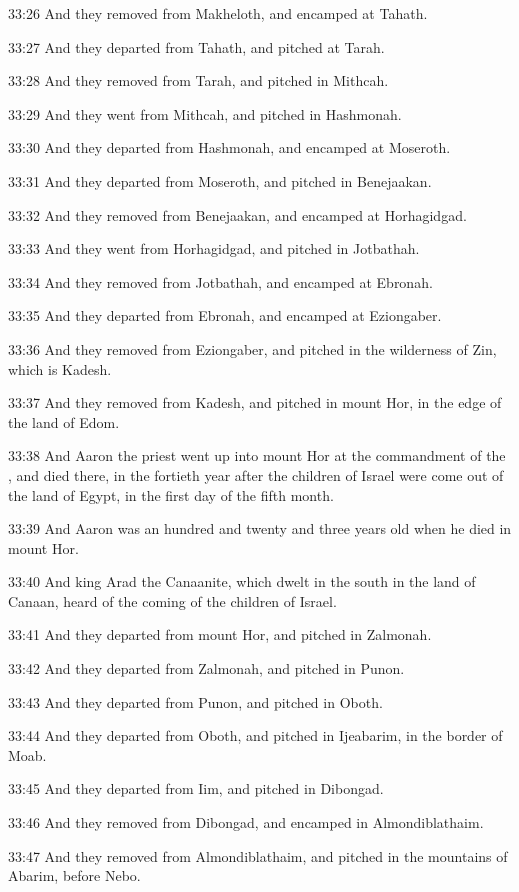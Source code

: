 33:26 And they removed from Makheloth, and encamped at Tahath.

33:27 And they departed from Tahath, and pitched at Tarah.

33:28 And they removed from Tarah, and pitched in Mithcah.

33:29 And they went from Mithcah, and pitched in Hashmonah.

33:30 And they departed from Hashmonah, and encamped at Moseroth.

33:31 And they departed from Moseroth, and pitched in Benejaakan.

33:32 And they removed from Benejaakan, and encamped at Horhagidgad.

33:33 And they went from Horhagidgad, and pitched in Jotbathah.

33:34 And they removed from Jotbathah, and encamped at Ebronah.

33:35 And they departed from Ebronah, and encamped at Eziongaber.

33:36 And they removed from Eziongaber, and pitched in the wilderness
of Zin, which is Kadesh.

33:37 And they removed from Kadesh, and pitched in mount Hor, in the
edge of the land of Edom.

33:38 And Aaron the priest went up into mount Hor at the commandment
of the \LORD, and died there, in the fortieth year after the children
of Israel were come out of the land of Egypt, in the first day of the
fifth month.

33:39 And Aaron was an hundred and twenty and three years old when he
died in mount Hor.

33:40 And king Arad the Canaanite, which dwelt in the south in the
land of Canaan, heard of the coming of the children of Israel.

33:41 And they departed from mount Hor, and pitched in Zalmonah.

33:42 And they departed from Zalmonah, and pitched in Punon.

33:43 And they departed from Punon, and pitched in Oboth.

33:44 And they departed from Oboth, and pitched in Ijeabarim, in the
border of Moab.

33:45 And they departed from Iim, and pitched in Dibongad.

33:46 And they removed from Dibongad, and encamped in Almondiblathaim.

33:47 And they removed from Almondiblathaim, and pitched in the
mountains of Abarim, before Nebo.


